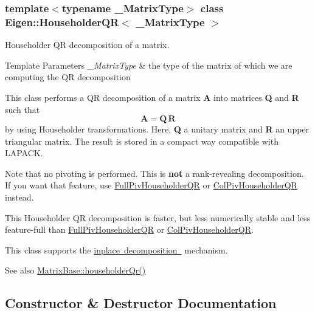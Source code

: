\subsubsection*{template$<$typename \+\_\+\+Matrix\+Type$>$\newline
class Eigen\+::\+Householder\+Q\+R$<$ \+\_\+\+Matrix\+Type $>$}

Householder QR decomposition of a matrix. 


\begin{DoxyTemplParams}{Template Parameters}
{\em \+\_\+\+Matrix\+Type} & the type of the matrix of which we are computing the QR decomposition\\
\hline
\end{DoxyTemplParams}
This class performs a QR decomposition of a matrix {\bfseries{A}} into matrices {\bfseries{Q}} and {\bfseries{R}} such that \[ \mathbf{A} = \mathbf{Q} \, \mathbf{R} \] by using Householder transformations. Here, {\bfseries{Q}} a unitary matrix and {\bfseries{R}} an upper triangular matrix. The result is stored in a compact way compatible with L\+A\+P\+A\+CK.

Note that no pivoting is performed. This is {\bfseries{not}} a rank-\/revealing decomposition. If you want that feature, use \mbox{\hyperlink{class_eigen_1_1_full_piv_householder_q_r}{Full\+Piv\+Householder\+QR}} or \mbox{\hyperlink{class_eigen_1_1_col_piv_householder_q_r}{Col\+Piv\+Householder\+QR}} instead.

This Householder QR decomposition is faster, but less numerically stable and less feature-\/full than \mbox{\hyperlink{class_eigen_1_1_full_piv_householder_q_r}{Full\+Piv\+Householder\+QR}} or \mbox{\hyperlink{class_eigen_1_1_col_piv_householder_q_r}{Col\+Piv\+Householder\+QR}}.

This class supports the \mbox{\hyperlink{}{inplace decomposition }} mechanism.

\begin{DoxySeeAlso}{See also}
\mbox{\hyperlink{class_eigen_1_1_matrix_base_a9a9377aab1cea26db5f25bab7e682f8f}{Matrix\+Base\+::householder\+Qr()}} 
\end{DoxySeeAlso}


\subsection{Constructor \& Destructor Documentation}
\mbox{\label{class_eigen_1_1_householder_q_r_a974adb10a0e066057aeb3b360df68380}} 
